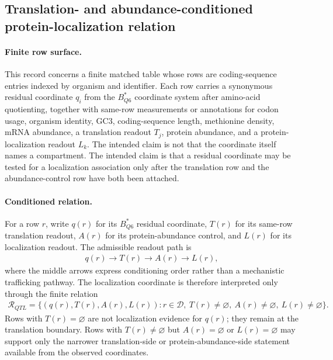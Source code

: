 \subsection{Translation- and abundance-conditioned protein-localization relation}\label{sec:q6-translation-abundance-conditioned-protein-localization}

\paragraph{Finite row surface.}
This record concerns a finite matched table whose rows are coding-sequence entries indexed by organism and identifier.  Each row carries a synonymous residual coordinate $q_i$ from the $B^{*}_{Q6}$ coordinate system after amino-acid quotienting, together with same-row measurements or annotations for codon usage, organism identity, GC3, coding-sequence length, methionine density, mRNA abundance, a translation readout $T_j$, protein abundance, and a protein-localization readout $L_k$.  The intended claim is not that the coordinate itself names a compartment.  The intended claim is that a residual coordinate may be tested for a localization association only after the translation row and the abundance-control row have both been attached.

\paragraph{Conditioned relation.}
For a row $r$, write $q(r)$ for its $B^{*}_{Q6}$ residual coordinate, $T(r)$ for its same-row translation readout, $A(r)$ for its protein-abundance control, and $L(r)$ for its localization readout.  The admissible readout path is
$$
\begin{aligned}
q(r) \longrightarrow T(r) \longrightarrow A(r) \longrightarrow L(r),
\end{aligned}
$$
where the middle arrows express conditioning order rather than a mechanistic trafficking pathway.  The localization coordinate is therefore interpreted only through the finite relation
$$
\begin{aligned}
\mathcal{R}_{QTL}
  = \{(q(r),T(r),A(r),L(r)) : r \in \mathcal{D},\ T(r) \neq \varnothing,\ A(r) \neq \varnothing,\ L(r) \neq \varnothing\}.
\end{aligned}
$$
Rows with $T(r)=\varnothing$ are not localization evidence for $q(r)$; they remain at the translation boundary.  Rows with $T(r)\neq\varnothing$ but $A(r)=\varnothing$ or $L(r)=\varnothing$ may support only the narrower translation-side or protein-abundance-side statement available from the observed coordinates.

